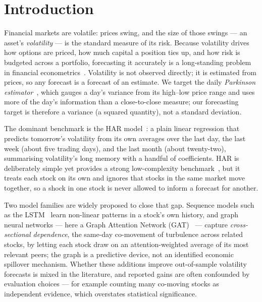\documentclass[runningheads]{llncs}
\begin{document}
\section{Introduction}
Financial markets are volatile: prices swing, and the size of those swings --- an asset's
\emph{volatility} --- is the standard measure of its risk. Because volatility drives how options
are priced, how much capital a position ties up, and how risk is budgeted across a portfolio,
forecasting it accurately is a long-standing problem in financial econometrics~\cite{corsi2009}.
Volatility is not observed directly; it is estimated from prices, so any forecast is a forecast of
an estimate. We target the daily \emph{Parkinson estimator}~\cite{parkinson1980}, which gauges a day's
variance from its high--low price range and uses more of the day's information than a close-to-close
measure; our
forecasting target is therefore a variance (a squared quantity), not a standard deviation.

The dominant benchmark is the HAR model~\cite{corsi2009}: a plain linear regression that predicts
tomorrow's volatility from its own averages over the last day, the last week (about five trading
days), and the last month (about twenty-two), summarising volatility's long memory with a handful
of coefficients. HAR is deliberately simple yet provides a strong low-complexity
benchmark~\cite{corsi2009,audrino2025}, but it treats each stock on
its own and ignores that stocks in the same market move together, so a shock in one stock is never
allowed to inform a forecast for another.

Two model families are widely proposed to close that gap. Sequence models such as the
LSTM~\cite{lstm1997} learn non-linear patterns in a stock's own history, and graph neural networks
--- here a Graph Attention Network (GAT)~\cite{gat2018} --- capture \emph{cross-sectional dependence},
the same-day co-movement of turbulence across related stocks, by letting each stock draw on an
attention-weighted average of its most relevant peers; the graph is a predictive device, not an
identified economic spillover mechanism. Whether these additions improve
out-of-sample volatility forecasts is mixed in the literature, and reported gains are often
confounded by evaluation choices --- for example counting many co-moving stocks as independent
evidence, which overstates statistical significance.
\end{document}
